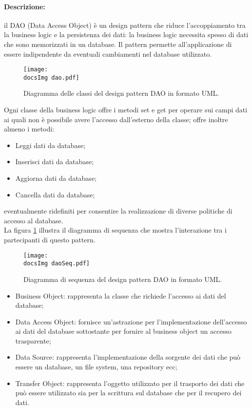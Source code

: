 {{\paragraph{Descrizione: }{il DAO (Data Access Object) è un design pattern che riduce l'accoppiamento tra la business logic e la persistenza dei dati: la business logic necessita spesso di dati che sono memorizzati in un database. Il pattern permette all'applicazione di essere indipendente da eventuali cambiamenti nel database utilizzato.\\
\begin{figure}[h!tbp]
		\centering
		\texttt{[image: \\docsImg dao.pdf]}
		\caption{Diagramma delle classi del design pattern DAO in formato UML\g .}
	\end{figure}
Ogni classe della business logic offre i metodi set e get per operare sui campi dati ai quali non è possibile avere l'accesso dall'esterno della classe; offre inoltre almeno i metodi:
\begin{itemize}
	\item Leggi dati da database;
	\item Inserisci dati da database;
	\item Aggiorna dati da database;
	\item Cancella dati da database;
\end{itemize}
eventualmente ridefiniti per consentire la realizzazione di diverse politiche di accesso al database.\\
La figura \ref{fig:daoSeq} illustra il diagramma di sequenza che mostra l'interazione tra i partecipanti di questo pattern.

\begin{figure}[h!tbp]
		\centering
		\texttt{[image: \\docsImg daoSeq.pdf]}
		\caption{Diagramma di sequenza del design pattern DAO in formato UML\g .}
		\label{fig:daoSeq}
\end{figure}

\begin{itemize}
	\item Business Object: rappresenta la classe che richiede l'accesso ai dati del database;
	\item Data Access Object: fornisce un'astrazione per l'implementazione dell'accesso ai dati del database sottostante per fornire al business object un accesso trasparente;
	\item Data Source: rappresenta l'implementazione della sorgente dei dati che può essere un database, un file system, una repository ecc;
	\item Transfer Object: rappresenta l'oggetto utilizzato per il trasporto dei dati che può essere utilizzato sia per la scrittura sul database che per il recupero dei dati.
\end{itemize}
	}
}}
